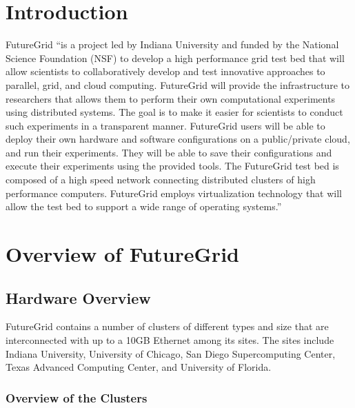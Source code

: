 \documentclass[graybox]{svmult}
\begin{document}
\abstract*{\ABSTRACT}

\abstract{\ABSTRACT}






\section{Introduction}


FutureGrid \cite{las2010gce,las12fg-bookchapter}``is a project led by Indiana University and funded by the National Science Foundation (NSF) to develop a high performance grid test bed that will allow scientists to collaboratively develop and test innovative approaches to parallel, grid, and cloud computing. FutureGrid will provide the infrastructure to researchers that allows them to perform their own computational experiments using distributed systems. The goal is to make it easier for scientists to conduct such experiments in a transparent manner.  FutureGrid users will be able to deploy their own hardware and software configurations on a public/private cloud, and run their experiments. They will be able to save their configurations and execute their experiments using the provided tools. The FutureGrid test bed is composed of a high speed network connecting distributed clusters of high performance computers. FutureGrid employs virtualization technology that will allow the test bed to support a wide range of operating systems.''






\section{Overview of FutureGrid}\label{S:overview}


\subsection{Hardware Overview}


FutureGrid contains a number of clusters of different types and size that are interconnected with up to a 10GB Ethernet among its sites. The sites include Indiana University, University of Chicago, San Diego Supercomputing Center, Texas Advanced Computing Center, and University of Florida.


\subsubsection{Overview of the Clusters}\label{S:hw-cluster} 
\end{document}
